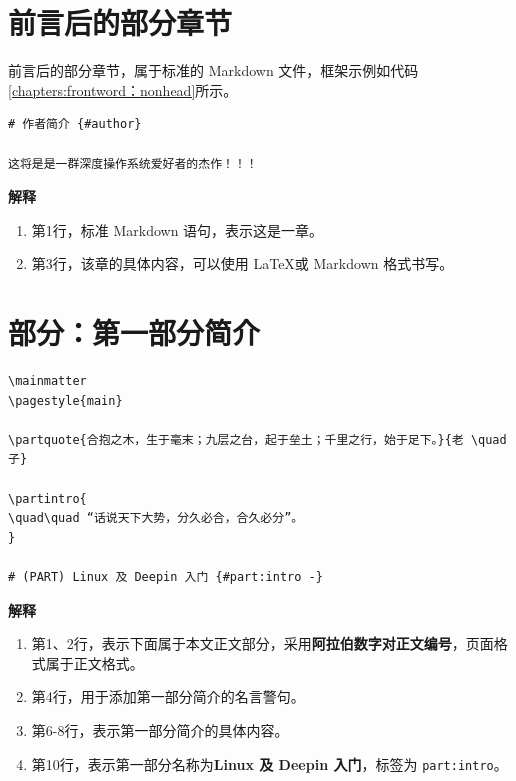\documentclass[doctor,openright,twoside]{sjtuthesis}
\newif\ifusepartquote
\newcommand{\thepartquote}{}
\newcommand{\thepartquoteauthor}{}
\newcommand{\partquote}[2]{\ifusepartquote\renewcommand{\thepartquote}{#1}\renewcommand{\thepartquoteauthor}{#2}\fi}
\newif\ifusepartintro
\newcommand{\thepartintro}{}
\newcommand{\partintro}[1]{\ifusepartintro\renewcommand{\thepartintro}{#1}\fi}
\providecommand{\tightlist}{%
    \setlength{\itemsep}{0pt}\setlength{\parskip}{0pt}}
\newcommand{\passthrough}[1]{#1}
\theoremstyle{plain}
\theoremstyle{definition}
\theoremstyle{remark}
\theoremstyle{ocrenumbox}
\theoremstyle{plain}
\begin{document}
\hypertarget{section-154}{%
\section{前言后的部分章节}\label{section-154}}

前言后的部分章节，属于标准的 Markdown 文件，框架示例如代码\ref{chapters:frontword：nonhead}所示。

\begin{lstlisting}[caption=前言后文示例, label={chapters:frontword：nonhead}]
# 作者简介 {#author}

这将是是一群深度操作系统爱好者的杰作！！！
\end{lstlisting}

\textbf{解释}

\begin{enumerate}
\def\labelenumi{\arabic{enumi}.}
\tightlist
\item
  第1行，标准 Markdown 语句，表示这是一章。
\item
  第3行，该章的具体内容，可以使用 \LaTeX 或 Markdown 格式书写。
\end{enumerate}

\hypertarget{section-155}{%
\section{部分：第一部分简介}\label{section-155}}

\begin{lstlisting}[caption=第一部分简介示例, label={sec:mainpage:firstparthead}]
\mainmatter
\pagestyle{main}

\partquote{合抱之木，生于毫末；九层之台，起于垒土；千里之行，始于足下。}{老 \quad 子}

\partintro{
\quad\quad “话说天下大势，分久必合，合久必分”。
}

# (PART) Linux 及 Deepin 入门 {#part:intro -}
\end{lstlisting}

\textbf{解释}

\begin{enumerate}
\def\labelenumi{\arabic{enumi}.}
\tightlist
\item
  第1、2行，表示下面属于本文正文部分，采用\textbf{阿拉伯数字对正文编号}，页面格式属于正文格式。
\item
  第4行，用于添加第一部分简介的名言警句。
\item
  第6-8行，表示第一部分简介的具体内容。
\item
  第10行，表示第一部分名称为\textbf{Linux 及 Deepin 入门}，标签为 \passthrough{\lstinline!part:intro!}。
\end{enumerate}
\end{document}
